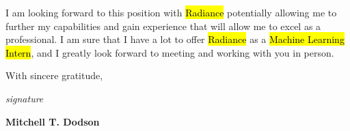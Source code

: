 \documentclass[11pt]{article}
\begin{document}
I am looking forward to this position with \hl{Radiance} potentially allowing me to further my capabilities and gain experience that will allow me to excel as a professional. I am sure that I have a lot to offer \hl{Radiance} as a \hl{Machine Learning Intern}, and I greatly look forward to meeting and working with you in person.

\noindent
With sincere gratitude,

\vspace{1em}

\noindent
\textit{ signature }

\vspace{1em}

\noindent
\textbf{Mitchell T. Dodson}

\printbibliography
\end{document}
